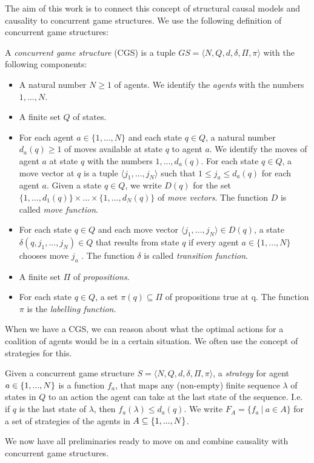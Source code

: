 The aim of this work is to connect this concept of structural causal models and causality to concurrent game structures. We use the following definition of concurrent game structures:
\begin{definition}\label{def:concurrent game structures}
    A \emph{concurrent game structure} (CGS) is a tuple $GS = \langle N, Q, d, \delta, \Pi, \pi \rangle$ with the following components:
    \begin{itemize}
        \item A natural number $N \geq 1$ of agents. We identify the \emph{agents} with the numbers $1, . . . , N$.
        \item A finite set $Q$ of states. 
        \item For each agent $a \in \{1, . . . , N\}$ and each state $q \in Q$, a natural number $d_a (q) \geq 1$ of moves available at state $q$ to agent $a$. We identify the moves of agent $a$ at state $q$ with the numbers $1, . . . , d_a (q)$. For each state $q \in Q$, a move vector at $q$ is a tuple $\langle j_1, . . . , j_N\rangle$  such that $1 \leq j_a \leq d_a (q)$ for each agent $a$. Given a state $q \in Q$, we write $D(q)$ for the set $\{1, . . . , d_1 (q)\} \times \dots \times \{1, . . . , d_N (q)\}$ of \emph{move vectors}. The function $D$ is called \emph{move function}.  
        \item For each state $q \in Q$ and each move vector $\langle j_1, . . . , j_N\rangle \in D(q)$, a state $\delta(q, j_1, . . . , j_N ) \in Q$ that results from state $q$ if every agent $a \in \{1, . . . , N\}$ chooses move $j_a$ . The function $\delta$ is called \emph{transition function}.
        \item A finite set $\Pi$ of \emph{propositions}. 
        \item For each state $q \in Q$, a set $\pi (q) \subseteq \Pi$ of propositions true at q. The function $\pi$ is the \emph{labelling function}. 
    \end{itemize}
\end{definition}


When we have a CGS, we can reason about what the optimal actions for a coalition of agents would be in a certain situation. We often use the concept of strategies for this.


\begin{definition}
    Given a concurrent game structure $S = \langle N, Q, d, \delta, \Pi, \pi \rangle$, a \emph{strategy} for agent $a\in\{ {1,...,N} \}$ is a function $f_a$, that maps any (non-empty) finite sequence $\lambda$ of states in $Q$ to an action the agent can take at the last state of the sequence. I.e. if $q$ is the last state of $\lambda$, then $f_a(\lambda) \leq d_a(q)$.
    We write $F_A = \{f_a\ | \ a \in A\}$ for a set of strategies of the agents in $A\subseteq \{ {1,...,N} \}$. 
\end{definition}

We now have all preliminaries ready to move on and combine causality with concurrent game structures.
